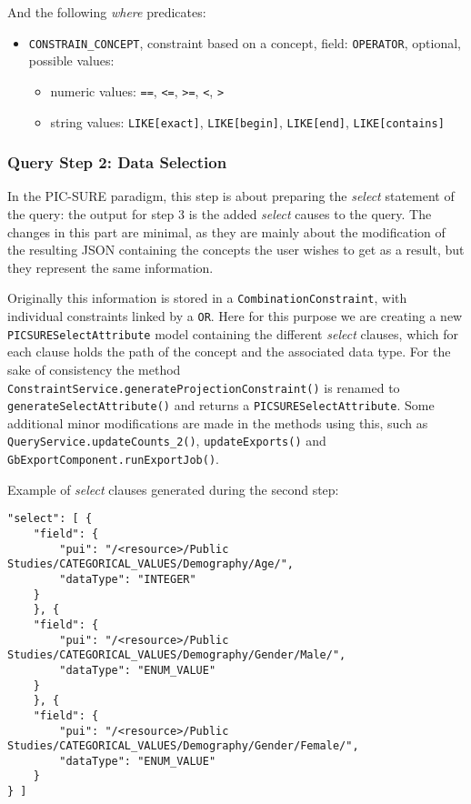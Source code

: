 And the following \emph{where} predicates:
\begin{itemize}
    \item \verb|CONSTRAIN_CONCEPT|, constraint based on a concept, field:
    \verb|OPERATOR|, optional, possible values:
    \begin{itemize}
        \item numeric values: \verb|==|, \verb|<=|, \verb|>=|, \verb|<|, \verb|>|
        \item string values: \verb|LIKE[exact]|, \verb|LIKE[begin]|, \verb|LIKE[end]|, \verb|LIKE[contains]|
    \end{itemize}
\end{itemize}


\subsubsection{Query Step 2: Data Selection}

In the PIC-SURE paradigm, this step is about preparing the \emph{select} statement of the query: the output for step 3 is the added \emph{select} causes to the query.
The changes in this part are minimal, as they are mainly about the modification of the resulting JSON containing the concepts the user wishes to get as a result, but they represent the same information.

Originally this information is stored in a \verb|CombinationConstraint|, with individual constraints linked by a \verb|OR|.
Here for this purpose we are creating a new \verb|PICSURESelectAttribute| model containing the different \emph{select} clauses, which for each clause holds the path of the concept and the associated data type.
For the sake of consistency the method \verb|ConstraintService.generateProjectionConstraint()| is renamed to \verb|generateSelectAttribute()| and returns a \verb|PICSURESelectAttribute|.
Some additional minor modifications are made in the methods using this, such as \verb|QueryService.updateCounts_2()|, \verb|updateExports()| and \verb|GbExportComponent.runExportJob()|.

Example of \emph{select} clauses generated during the second step:
\begin{verbatim}
"select": [ {
    "field": {
        "pui": "/<resource>/Public Studies/CATEGORICAL_VALUES/Demography/Age/",
        "dataType": "INTEGER"
    }
    }, {
    "field": {
        "pui": "/<resource>/Public Studies/CATEGORICAL_VALUES/Demography/Gender/Male/",
        "dataType": "ENUM_VALUE"
    }
    }, {
    "field": {
        "pui": "/<resource>/Public Studies/CATEGORICAL_VALUES/Demography/Gender/Female/",
        "dataType": "ENUM_VALUE"
    }
} ]
\end{verbatim}

